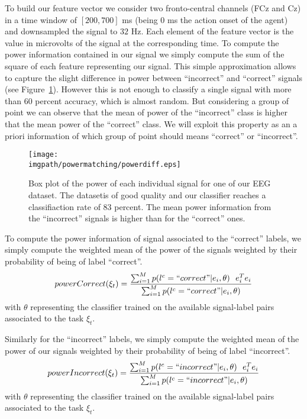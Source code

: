To build our feature vector we consider two fronto-central channels (FCz and Cz) in a time window of $[200,700]$ ms (being 0 ms the action onset of the agent) and downsampled the signal to $32$ Hz. Each element of the feature vector is the value in microvolts of the signal at the corresponding time. To compute the power information contained in our signal we simply compute the sum of the square of each feature representing our signal. This simple approximation allows to capture the slight difference in power between ``incorrect'' and ``correct'' signals (see Figure~\ref{fig:EEGpower}). However this is not enough to classify a single signal with more than 60 percent accuracy, which is almost random. But considering a group of point we can observe that the mean of power of the ``incorrect'' class is higher that the mean power of the ``correct'' class. We will exploit this property as an a priori information of which group of point should means ``correct'' or ``incorrect''.

\begin{figure}[!htbp]
\centering
\texttt{[image: \\imgpath/powermatching/powerdiff.eps]}
\caption{Box plot of the power of each individual signal for one of our EEG dataset. The datasetis of good quality and our classifier reaches a classifiaction rate of 83 percent. The mean power information from the ``incorrect'' signals is higher than for the ``correct'' ones.}
\label{fig:EEGpower}
\end{figure} 


To compute the power information of signal associated to the ``correct'' labels, we simply compute the weighted mean of the power of the signals weighted by their probability of being of label ``correct''. 
\begin{eqnarray}
powerCorrect(\xi_t) = \frac{\sum_{i = 1}^{M} p(l^c = ``correct"| e_i , \theta) ~~ e_i^T e_i}{\sum_{i = 1}^{M} p(l^c = ``correct"| e_i , \theta)}
\label{eq:powerCorrect}
\end{eqnarray}
with $\theta$ representing the classifier trained on the available signal-label pairs associated to the task $\xi_t$.

Similarly for the ``incorrect'' labels, we simply compute the weighted mean of the power of our signals weighted by their probability of being of label ``incorrect''. 
\begin{eqnarray}
powerIncorrect(\xi_t) = \frac{\sum_{i = 1}^{M} p(l^c = ``incorrect"| e_i , \theta) ~~ e_i^T e_i}{\sum_{i = 1}^{M} p(l^c = ``incorrect"| e_i , \theta)}
\label{eq:powerIncorrect}
\end{eqnarray}
with $\theta$ representing the classifier trained on the available signal-label pairs associated to the task $\xi_t$.

